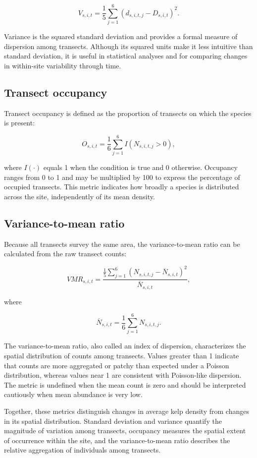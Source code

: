 \documentclass[11pt]{article}
\begin{document}
	\begin{equation}
		V_{s,i,t}
		=
		\frac{1}{5}
		\sum_{j=1}^{6}
		\left(d_{s,i,t,j}-D_{s,i,t}\right)^2.
	\end{equation}
	
	Variance is the squared standard deviation and provides a formal
	measure of dispersion among transects. Although its squared units make
	it less intuitive than standard deviation, it is useful in statistical
	analyses and for comparing changes in within-site variability through
	time.
	
	\subsection*{Transect occupancy}
	
	Transect occupancy is defined as the proportion of transects on which
	the species is present:
	
	\begin{equation}
		O_{s,i,t}
		=
		\frac{1}{6}
		\sum_{j=1}^{6}
		I\left(N_{s,i,t,j}>0\right),
	\end{equation}
	
	where \(I(\cdot)\) equals 1 when the condition is true and 0 otherwise.
	Occupancy ranges from 0 to 1 and may be multiplied by 100 to express
	the percentage of occupied transects. This metric indicates how
	broadly a species is distributed across the site, independently of its
	mean density.
	
	\subsection*{Variance-to-mean ratio}
	
	Because all transects survey the same area, the variance-to-mean ratio
	can be calculated from the raw transect counts:
	
	\begin{equation}
		VMR_{s,i,t}
		=
		\frac{
			\displaystyle
			\frac{1}{5}
			\sum_{j=1}^{6}
			\left(N_{s,i,t,j}-\overline{N}_{s,i,t}\right)^2
		}{
			\overline{N}_{s,i,t}
		},
	\end{equation}
	
	where
	
	\begin{equation*}
		\overline{N}_{s,i,t}
		=
		\frac{1}{6}
		\sum_{j=1}^{6}
		N_{s,i,t,j}.
	\end{equation*}
	
	The variance-to-mean ratio, also called an index of dispersion,
	characterizes the spatial distribution of counts among transects.
	Values greater than 1 indicate that counts are more aggregated or
	patchy than expected under a Poisson distribution, whereas values near
	1 are consistent with Poisson-like dispersion. The metric is undefined
	when the mean count is zero and should be interpreted cautiously when
	mean abundance is very low.
	
	Together, these metrics distinguish changes in average kelp density
	from changes in its spatial distribution. Standard deviation and
	variance quantify the magnitude of variation among transects,
	occupancy measures the spatial extent of occurrence within the site,
	and the variance-to-mean ratio describes the relative aggregation of
	individuals among transects.
	
\end{document}
